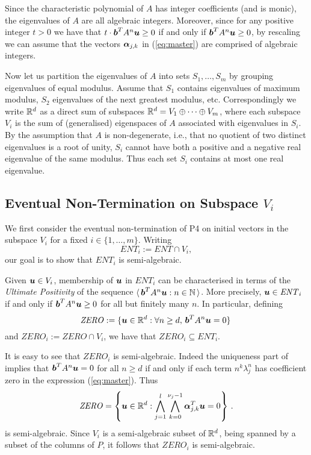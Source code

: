 Since the characteristic polynomial of $A$ has integer coefficients (and is monic), the eigenvalues of $A$ are all algebraic integers.  Moreover, since for any positive integer $t>0$ we have that $t\cdot \boldsymbol{b}^TA^n\boldsymbol{u} \geq 0$ if and only if $\boldsymbol{b}^TA^n\boldsymbol{u}\geq 0$, by rescaling we can assume that the vectors $\boldsymbol{\alpha}_{j,k}$ in (\ref{eq:master}) are comprised of algebraic integers.

Now let us partition the eigenvalues of $A$ into sets $S_1,\ldots,S_m$
by grouping eigenvalues of equal modulus.  Assume that $S_1$ contains
eigenvalues of maximum modulus, $S_2$ eigenvalues of the next greatest
modulus, etc.  Correspondingly we write $\mathbb{R}^{d}$ as a
direct sum of subspaces $\mathbb{R}^{d} = V_1 \oplus \cdots \oplus V_m$,
where each subspace $V_i$ is the sum of (generalised) eigenspaces of
$A$ associated with eigenvalues in $S_i$.  By the assumption that $A$ is
non-degenerate, i.e., that no quotient of two distinct eigenvalues is
a root of unity, $S_i$ cannot have both a positive and a negative real
eigenvalue of the same modulus.  Thus each set $S_i$ contains at most one
real eigenvalue.

\subsection{Eventual Non-Termination on Subspace $V_i$}
We first consider the eventual non-termination of \textsf{P4} on
initial vectors in the subspace $V_i$ for a fixed $i \in
\lbrace 1,\ldots,m\rbrace$.  Writing
\begin{equation*}
  \mathit{ENT}_i := \mathit{ENT} \cap V_i,
\end{equation*}
our goal is to show that $\mathit{ENT}_i$ is semi-algebraic.

Given $\boldsymbol{u} \in V_i$, membership of $\boldsymbol{u}$ in
$\mathit{ENT}_i$ can be characterised in terms of the \emph{Ultimate Positivity} of the sequence $\langle\,
\boldsymbol{b}^TA^n\boldsymbol{u}:n\in\mathbb{N}\,\rangle$.  More
precisely, $\boldsymbol{u} \in \mathit{ENT}_i$ if and only if
$\boldsymbol{b}^TA^n\boldsymbol{u} \geq 0$ for all but finitely many
$n$.  In particular, defining
\[ \mathit{ZERO}:=\lbrace \boldsymbol{u} \in \mathbb{R}^{d}: \forall
n\geq d,\, \boldsymbol{b}^TA^n\boldsymbol{u}=0 \rbrace \, \] and
$\mathit{ZERO}_i:=\mathit{ZERO}\cap V_i$, we have that
$\mathit{ZERO}_i\subseteq \mathit{ENT}_i$.

It is easy to see that $\mathit{ZERO}_i$ is semi-algebraic.  Indeed
the uniqueness part of~\cite[Proposition 2.11]{TUCS05} implies that
$\boldsymbol{b}^TA^n\boldsymbol{u}=0$ for all $n\geq d$ if and only if
each term $n^k\lambda_j^n$ has coefficient zero in the expression
(\ref{eq:master}).  Thus
\[ \mathit{ZERO} = \left\lbrace \boldsymbol{u}\in \mathbb{R}^{d} :
\bigwedge_{j=1}^{l}\bigwedge_{k=0}^{\nu_j-1}
\boldsymbol{\alpha}_{j,k}^T\boldsymbol{u}= 0 \right\rbrace \, .\] is
semi-algebraic.  Since $V_i$ is a semi-algebraic subset of
$\mathbb{R}^{d}$, being spanned by a subset of the columns of $P$, it
follows that $\mathit{ZERO}_i$ is semi-algebraic.

